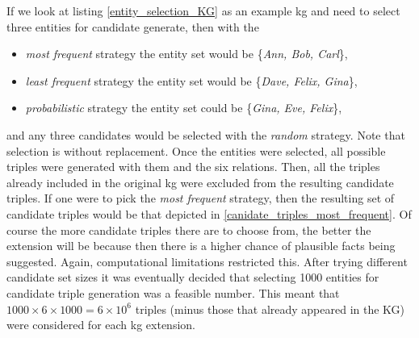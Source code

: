 If we look at listing \ref{entity_selection_KG} as an example \gls{kg} and need to select three entities for candidate generate, then with the 
\begin{itemize}
    \item \textit{most frequent} strategy the entity set would be \{\textit{Ann, Bob, Carl}\},
    \item \textit{least frequent} strategy the entity set would be \{\textit{Dave, Felix, Gina}\},
    \item \textit{probabilistic} strategy the entity set could be \{\textit{Gina, Eve, Felix}\},
\end{itemize}
and any three candidates would be selected with the \textit{random} strategy. Note that selection is without replacement. Once the entities were selected, all possible triples were generated with them and the six relations. Then, all the triples already included in the original \gls{kg} were excluded from the resulting candidate triples. If one were to pick the \textit{most frequent} strategy, then the resulting set of candidate triples would be that depicted in \cref{canidate_triples_most_frequent}. Of course the more candidate triples there are to choose from, the better the extension will be because then there is a higher chance of plausible facts being suggested. Again, computational limitations restricted this. After trying different candidate set sizes it was eventually decided that selecting 1000 entities for candidate triple generation was a feasible number. This meant that $ 1000 \times 6 \times 1000 = 6 \times 10^6 $ triples (minus those that already appeared in the KG) were considered for each \gls{kg} extension.


